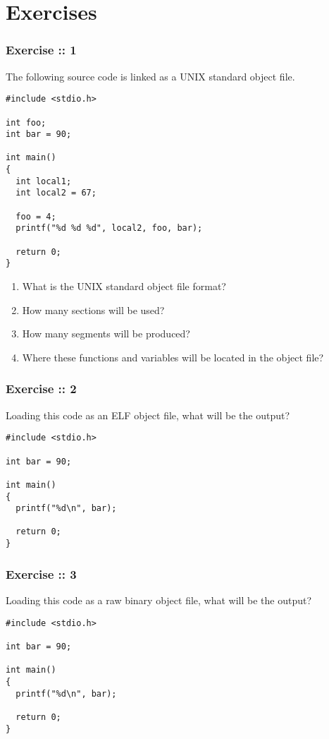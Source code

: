 %
%

\section{Exercises}


\begin{frame}[containsverbatim]
  \frametitle{Exercise :: 1}

The following source code is linked as a UNIX standard object file.

\begin{verbatim}
#include <stdio.h>

int foo;
int bar = 90;

int main()
{
  int local1;
  int local2 = 67;

  foo = 4;
  printf("%d %d %d", local2, foo, bar);  

  return 0;
}
\end{verbatim}

\begin{enumerate}
    \item
    What is the UNIX standard object file format?
    \item
    How many sections will be used?
    \item
    How many segments will be produced?
    \item
    Where these functions and variables will be located in the object file?
   \end{enumerate}

\end{frame}


\begin{frame}[containsverbatim]
  \frametitle{Exercise :: 2}

Loading this code as an ELF object file, what will be the output?

\begin{verbatim}
#include <stdio.h>

int bar = 90;

int main()
{
  printf("%d\n", bar);

  return 0;
}
\end{verbatim}


\end{frame}


\begin{frame}[containsverbatim]
  \frametitle{Exercise :: 3}

Loading this code as a raw binary object file, what will be the output?

\begin{verbatim}
#include <stdio.h>

int bar = 90;

int main()
{
  printf("%d\n", bar);

  return 0;
}
\end{verbatim}

\end{frame}



